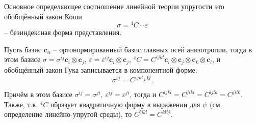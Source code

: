 
Основное определяющее соотношение линейной теории упругости это обобщённый закон Коши
\[
  \sigma = {}^4 C \cdot\cdot \varepsilon
\]
-- безиндексная форма представления.

Пусть базис $\mathbf{c}_\alpha$ -- ортонормированный базис главных осей анизотропии, тогда в этом базисе
$\sigma = \sigma^{ij} \mathbf{c}_i \otimes \mathbf{c}_j$,
$\varepsilon = \varepsilon^{ij} \mathbf{c}_i \otimes \mathbf{c}_j$, 
${}^4 C = C^{ijkl} \mathbf{c}_i \otimes \mathbf{c}_j \otimes \mathbf{c}_k \otimes \mathbf{c}_l$, и обобщённый закон Гука записывается в компонентной форме:
\[
  \sigma^{ij} = C^{ijkl} \varepsilon^{kl}.
\]

Причём в этом базисе $\sigma^{ij} = \sigma^{ji}$, $\varepsilon^{ij} = \varepsilon^{ji}$,
тогда и $C^{ijkl} = C^{jikl} = C^{ijlk} = C^{jilk}$. Также, т.к. ${}^4 C$ образует
квадратичную форму в выражении для $\psi$ (см. определение линейно-упругой среды), то
$C^{ijkl} = C^{klij}$.
